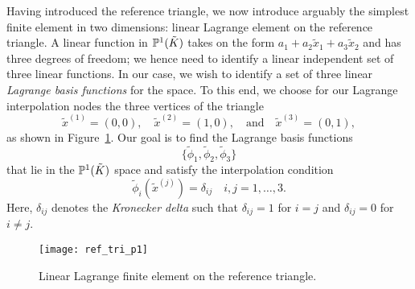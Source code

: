 Having introduced the reference triangle, we now introduce arguably the simplest finite element in two dimensions: linear Lagrange element on the reference triangle. A linear function in $\mathbb{P}^1(\tilde K)$ takes on the form $a_1 + a_2 \tilde x_1 + a_3 \tilde x_2$ and has three degrees of freedom; we hence need to identify a linear independent set of three linear functions.  In our case, we wish to identify a set of three linear \emph{Lagrange basis functions} for the space.  To this end, we choose for our Lagrange interpolation nodes the three vertices of the triangle
\begin{equation*}
  \tilde x^{(1)} = (0,0), \quad \tilde x^{(2)} = (1,0), \quad \text{and} \quad \tilde x^{(3)} = (0,1),
\end{equation*}
as shown in Figure~\ref{fig:fe_ref_tri_p1}. Our goal is to find the Lagrange basis functions
\begin{equation*}
  \{ \tilde \phi_1, \tilde \phi_2, \tilde \phi_3 \}
\end{equation*}
that lie in the $\mathbb{P}^1(\tilde K)$ space and satisfy the interpolation condition
\begin{equation}
  \tilde \phi_i(\tilde x^{(j)}) = \delta_{ij} \quad i,j = 1,\dots,3.
   \label{eq:fe_interp_tri}
\end{equation}
Here, $\delta_{ij}$ denotes the \emph{Kronecker delta} such that $\delta_{ij} = 1$ for $i = j$ and $\delta_{ij} = 0$ for $i \neq j$.

\begin{figure}
  \centering
  \texttt{[image: ref\_tri\_p1]}
  \caption{Linear Lagrange finite element on the reference triangle.}
  \label{fig:fe_ref_tri_p1}
\end{figure}


